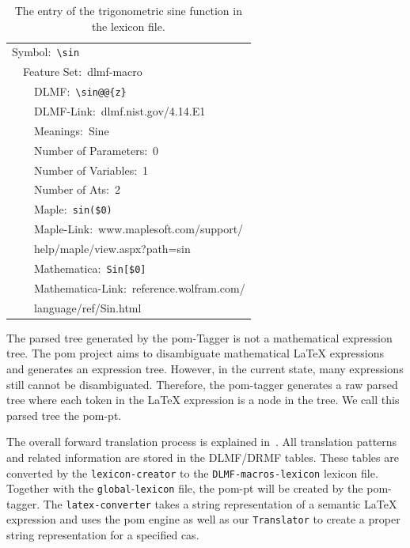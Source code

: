 \documentclass[a4paper,11pt]{article}
\theoremstyle{defTheoStyle}
\theoremstyle{defExampStyle}
\begin{document}
\begin{table}[ht!]
	\centering
	\begin{tabular}{lll}
	\hline
	\multicolumn{3}{l}{Symbol:~\texttt{\textbackslash sin}} \\
	\! & \multicolumn{2}{l}{Feature Set:~dlmf-macro} \\
	\! & \! & DLMF:~\verb|\sin@@{z}|\\
	\! & \! & DLMF-Link:~dlmf.nist.gov/4.14.E1\\
	\! & \! & Meanings:~Sine\\
	\! & \! & Number of Parameters:~0\\
	\! & \! & Number of Variables:~1\\
	\! & \! & Number of Ats:~2\\
	\! & \! & Maple:~\verb|sin($0)|\\
	\! & \! & Maple-Link:~www.maplesoft.com/support/\\
	\! & \! & \hspace{32pt} help/maple/view.aspx?path=sin\\
	\! & \! & Mathematica:~\verb|Sin[$0]|\\
	\! & \! & Mathematica-Link:~reference.wolfram.com/\\
	\! & \! & \hspace{32pt} language/ref/Sin.html\\
	\hline
	\end{tabular}
	\caption{The entry of the trigonometric sine function in the lexicon file.}
	\label{tab:sine-lex-example}
\end{table}

The parsed tree generated by the \gls*{pom}-Tagger is not a mathematical expression tree. The \gls*{pom} project aims to disambiguate mathematical \LaTeX{} expressions and generates an expression tree. However, in the current state, many expressions still cannot be disambiguated. Therefore, the \gls*{pom}-tagger generates a raw parsed tree where each token in the \LaTeX{} expression is a node in the tree. We call this parsed tree the \gls*{pom-pt}.

{\sloppy The overall forward translation process is explained in~. All translation patterns and related information are stored in the DLMF/DRMF tables. These tables are converted by the \verb|lexicon-creator| to the \verb|DLMF-macros-lexicon| lexicon file. Together with the \verb|global|-\verb|lexicon| file, the \gls*{pom-pt} will be created by the \gls*{pom}-tagger. The \verb|latex-converter| takes a string representation of a semantic \LaTeX{} expression and uses the \gls*{pom} engine as well as our \verb|Translator| to create a proper string representation for a specified \gls*{cas}.}
\end{document}
